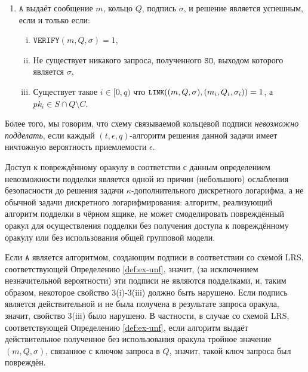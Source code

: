 \documentclass{llncs}
\newcommand{\A}{\texttt{A}}
\begin{document}
\begin{definition}
\begin{enumerate}
\item $\A$ выдаёт сообщение $m$, кольцо $Q$, подпись $\sigma$, и решение является успешным, если и только если:
    \begin{enumerate}[(i)]
    \item $\texttt{VERIFY}(m, Q, \sigma) = 1$,

    \item Не существует никакого запроса, полученного $\texttt{SO}$, выходом которого является $\sigma$,

    \item Существует такое $i \in [0,q)$ что ${\small \texttt{LINK}((m, Q, \sigma), (m_i, Q_i, \sigma_i)) = 1}$, а $pk_i \in S \cap Q \setminus C$.
    \end{enumerate}
\end{enumerate}
Более того, мы говорим, что схему связываемой кольцевой подписи \textit{невозможно подделать}, если каждый $(t, \epsilon, q)$-алгоритм решения данной задачи имеет ничтожную вероятность приемлемости $\epsilon$.
\end{definition}

\begin{remark}
Доступ к повреждённому оракулу в соответстви с данным определением невозможности подделки является одной из причин (небольшого) ослабления безопасности до решения задачи $\kappa$-дополнительного дискретного логарифма, а не обычной задачи дискретного логарифмирования: алгоритм, реализующий алгоритм подделки в чёрном ящике, не может смоделировать повреждённый оракул для осуществления подделки без получения доступа к повреждённому оракулу или без использования общей групповой модели.
\end{remark}

\begin{remark}
Если $\A$ является алгоритмом, создающим подписи в соответствии со схемой LRS, соответствующей Определению \ref{def:ex-unf}, значит, (за исключением незначительной вероятности) эти подписи не являются подделками, и, таким образом, некоторое свойство 3(i)-3(iii) должно быть нарушено. Если подпись является действительной и не была получена в результате запроса оракула, значит, свойство 3(iii) было нарушено. В частности, в случае со схемой LRS, соответствующей Определению \ref{def:ex-unf}, если алгоритм выдаёт действительное полученное без использования оракула тройное значение $(m, Q, \sigma)$, связанное с ключом запроса в $Q$, значит, такой ключ запроса был повреждён.
\end{remark}
\end{document}

